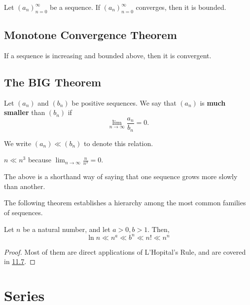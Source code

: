 \documentclass{article}
\begin{document}
    \begin{thm}
        Let \((a_n)_{n=0}^{\infty}\) be a sequence. If \((a_n)_{n=0}^{\infty}\) converges, then it is bounded.
    \end{thm}

    \subsection{Monotone Convergence Theorem}
    \begin{thm}
      If a sequence is increasing and bounded above, then it is convergent.
    \end{thm}
    
    \subsection{The BIG Theorem}
    \begin{defi}
      Let \((a_n)\) and \((b_n)\) be positive sequences. We say that \((a_n)\) is \textbf{much smaller} than \((b_n)\) if
      \[
        \lim_{n \to \infty}\frac{a_n}{b_n} = 0.
      \]
    
      We write \((a_n) \ll (b_n)\) to denote this relation.
    \end{defi} 
    
    \begin{eg}
      \(n \ll n^3\) because \(\lim_{n \to \infty} \frac{n}{n^3} = 0\).
    \end{eg}
    
    The above is a shorthand way of saying that one sequence grows more slowly than another. 
    
    The following theorem establishes a hierarchy among the most common families of sequences.
    
    \begin{thm}
      Let \(n\) be a natural number, and let \(a > 0, b > 1\). Then,
      \[
        \ln{n} \ll n^a \ll b^n \ll n! \ll n^n
      \]
    \end{thm}
    
    \begin{proof}
      Most of them are direct applications of L'Hopital's Rule, and are covered in \href{https://youtu.be/Dd3n2rfqxf4?si=sRu9ItBn7WwUNnSj}{11.7}. 
    \end{proof}

    \pagebreak

    \section{Series}
\end{document}
